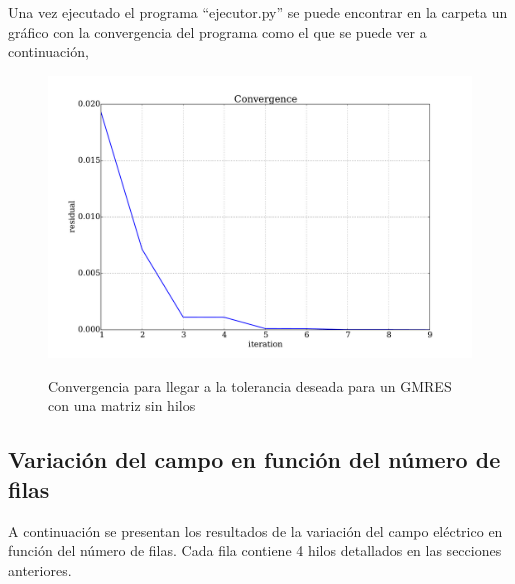 \documentclass[12pt,letterpaper]{article}
\numberwithin{equation}{section}
\begin{document}
Una vez ejecutado el programa ``ejecutor.py'' se puede encontrar en la carpeta un gráfico con la convergencia del programa como el que se puede ver a continuación,

\begin{figure}[H]
	\centering\includegraphics[scale=0.35]{Imagenes/Convergence.pdf}\\
	\caption{Convergencia para llegar a la tolerancia deseada para un GMRES con una matriz sin hilos}
	\label{fig:convergence}
\end{figure} 

\subsection{Variación del campo en función del número de filas}

A continuación se presentan los resultados de la variación del campo eléctrico en función del número de filas. Cada fila contiene 4 hilos detallados en las secciones anteriores.
\end{document}
